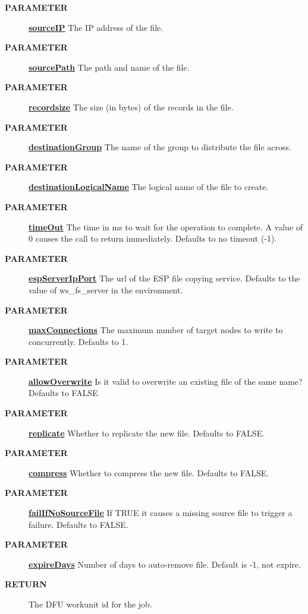 \par
\begin{description}
\item [\colorbox{tagtype}{\color{white} \textbf{\textsf{PARAMETER}}}] \textbf{\underline{sourceIP}} The IP address of the file.
\item [\colorbox{tagtype}{\color{white} \textbf{\textsf{PARAMETER}}}] \textbf{\underline{sourcePath}} The path and name of the file.
\item [\colorbox{tagtype}{\color{white} \textbf{\textsf{PARAMETER}}}] \textbf{\underline{recordsize}} The size (in bytes) of the records in the file.
\item [\colorbox{tagtype}{\color{white} \textbf{\textsf{PARAMETER}}}] \textbf{\underline{destinationGroup}} The name of the group to distribute the file across.
\item [\colorbox{tagtype}{\color{white} \textbf{\textsf{PARAMETER}}}] \textbf{\underline{destinationLogicalName}} The logical name of the file to create.
\item [\colorbox{tagtype}{\color{white} \textbf{\textsf{PARAMETER}}}] \textbf{\underline{timeOut}} The time in ms to wait for the operation to complete. A value of 0 causes the call to return immediately. Defaults to no timeout (-1).
\item [\colorbox{tagtype}{\color{white} \textbf{\textsf{PARAMETER}}}] \textbf{\underline{espServerIpPort}} The url of the ESP file copying service. Defaults to the value of ws\_fs\_server in the environment.
\item [\colorbox{tagtype}{\color{white} \textbf{\textsf{PARAMETER}}}] \textbf{\underline{maxConnections}} The maximum number of target nodes to write to concurrently. Defaults to 1.
\item [\colorbox{tagtype}{\color{white} \textbf{\textsf{PARAMETER}}}] \textbf{\underline{allowOverwrite}} Is it valid to overwrite an existing file of the same name? Defaults to FALSE
\item [\colorbox{tagtype}{\color{white} \textbf{\textsf{PARAMETER}}}] \textbf{\underline{replicate}} Whether to replicate the new file. Defaults to FALSE.
\item [\colorbox{tagtype}{\color{white} \textbf{\textsf{PARAMETER}}}] \textbf{\underline{compress}} Whether to compress the new file. Defaults to FALSE.
\item [\colorbox{tagtype}{\color{white} \textbf{\textsf{PARAMETER}}}] \textbf{\underline{failIfNoSourceFile}} If TRUE it causes a missing source file to trigger a failure. Defaults to FALSE.
\item [\colorbox{tagtype}{\color{white} \textbf{\textsf{PARAMETER}}}] \textbf{\underline{expireDays}} Number of days to auto-remove file. Default is -1, not expire.
\item [\colorbox{tagtype}{\color{white} \textbf{\textsf{RETURN}}}] \textbf{\underline{}} The DFU workunit id for the job.
\end{description}

